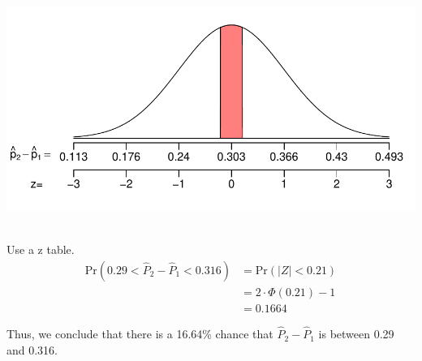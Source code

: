 \begin{solution}
\includegraphics{diff_sampling_central_area-1.pdf} ~

Use a z table. \[
\begin{aligned}
\text{Pr}\left(0.29 < \hat{P}_2 - \hat{P}_1 < 0.316\right) &= \text{Pr}(|Z|<0.21) \\
&= 2\cdot\Phi(0.21)-1 \\
&= 0.1664
\end{aligned}
\]

Thus, we conclude that there is a 16.64\% chance that
\(\hat{P}_2-\hat{P}_1\) is between 0.29 and 0.316.
\end{solution}

